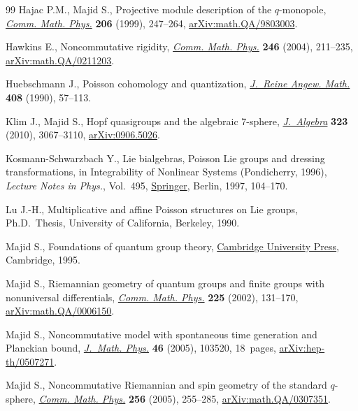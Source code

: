 \documentclass[pdftex]{sigma}
\numberwithin{equation}{section}
\newcommand{\<}{{\langle}}
\renewcommand{\>}{{\rangle}}
\begin{document}
\begin{thebibliography}{99}
Hajac P.M., Majid S., Projective module description of the {$q$}-monopole,
 \href{https://doi.org/10.1007/s002200050704}{\textit{Comm. Math. Phys.}} \textbf{206} (1999), 247--264,
 \href{https://arxiv.org/abs/math.QA/9803003}{arXiv:math.QA/9803003}.

Hawkins E., Noncommutative rigidity, \href{https://doi.org/10.1007/s00220-004-1036-4}{\textit{Comm. Math. Phys.}} \textbf{246}
 (2004), 211--235, \href{https://arxiv.org/abs/math.QA/0211203}{arXiv:math.QA/0211203}.

Huebschmann J., Poisson cohomology and quantization, \href{https://doi.org/10.1515/crll.1990.408.57}{\textit{J.~Reine Angew.
 Math.}} \textbf{408} (1990), 57--113.

Klim J., Majid S., Hopf quasigroups and the algebraic 7-sphere,
 \href{https://doi.org/10.1016/j.jalgebra.2010.03.011}{\textit{J.~Algebra}} \textbf{323} (2010), 3067--3110, \href{https://arxiv.org/abs/0906.5026}{arXiv:0906.5026}.

Kosmann-Schwarzbach Y., Lie bialgebras, {P}oisson {L}ie groups and dressing
 transformations, in Integrability of Nonlinear Systems ({P}ondicherry, 1996),
 \textit{Lecture Notes in Phys.}, Vol.~495, \href{https://doi.org/10.1007/BFb0113695}{Springer}, Berlin, 1997, 104--170.

Lu J.-H., Multiplicative and affine {P}oisson structures on {L}ie groups, Ph.D.~Thesis, {U}niversity of California, Berkeley, 1990.

Majid S., Foundations of quantum group theory, \href{https://doi.org/10.1017/CBO9780511613104}{Cambridge University Press},
 Cambridge, 1995.

Majid S., Riemannian geometry of quantum groups and finite groups with
 nonuniversal differentials, \href{https://doi.org/10.1007/s002201000564}{\textit{Comm. Math. Phys.}} \textbf{225} (2002),
 131--170, \href{https://arxiv.org/abs/math.QA/0006150}{arXiv:math.QA/0006150}.

Majid S., Noncommutative model with spontaneous time generation and {P}lanckian
 bound, \href{https://doi.org/10.1063/1.2084748}{\textit{J.~Math. Phys.}} \textbf{46} (2005), 103520, 18~pages,
 \href{https://arxiv.org/abs/hep-th/0507271}{arXiv:hep-th/0507271}.

Majid S., Noncommutative {R}iemannian and spin geometry of the standard
 {$q$}-sphere, \href{https://doi.org/10.1007/s00220-005-1295-8}{\textit{Comm. Math. Phys.}} \textbf{256} (2005), 255--285,
 \href{https://arxiv.org/abs/math.QA/0307351}{arXiv:math.QA/0307351}.


\end{thebibliography}
\end{document}

